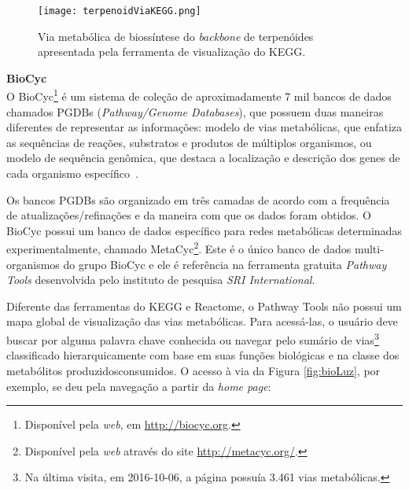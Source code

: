 \newpage

\begin{figure}[!h]
\centering
\texttt{[image: terpenoidViaKEGG.png]}
\caption{Via metabólica de biossíntese do \textit{backbone} de terpenóides apresentada pela ferramenta de visualização do KEGG.}
\label{terpenoidBackboneKEGG}
\end{figure}

\break


\textbf{BioCyc} \\

\indent O BioCyc\footnote{Disponível pela \textit{web}, em \url{http://biocyc.org}.} é um sistema de coleção de aproximadamente 7 mil bancos de dados chamados PGDBs (\textit{Pathway/Genome Databases}), que possuem duas maneiras diferentes de representar as informações: modelo de vias metabólicas, que enfatiza as sequências de reações, substratos e produtos de múltiplos organismos, ou modelo de sequência genômica, que destaca a localização e descrição dos genes de cada organismo específico~\cite{biocycIntro}. 

\indent Os bancos PGDBs são organizado em três camadas de acordo com a frequência de atualizações/refinações e da maneira com que os dados foram obtidos. O BioCyc possui um banco de dados específico para redes metabólicas determinadas experimentalmente, chamado MetaCyc\footnote{Disponível pela \textit{web} através do site \url{http://metacyc.org/}.}. Este é o único banco de dados multi-organismos do grupo BioCyc e ele é referência na ferramenta gratuita \textit{Pathway Tools} desenvolvida pelo instituto de pesquisa \textit{SRI International}.

\indent Diferente das ferramentas do KEGG e Reactome, o Pathway  Tools não possui um mapa global de visualização das vias metabólicas. Para acessá-las, o usuário deve buscar por alguma palavra chave conhecida ou navegar pelo sumário de vias\footnote{Na última visita, em 2016-10-06, a página possuía 3.461 vias metabólicas.} classificado hierarquicamente com base em suas funções biológicas e na classe dos metabólitos produzidos\/consumidos. O acesso à via da Figura \ref{fig:bioLuz}, por exemplo, se deu pela navegação a partir da \textit{home page}: \\

